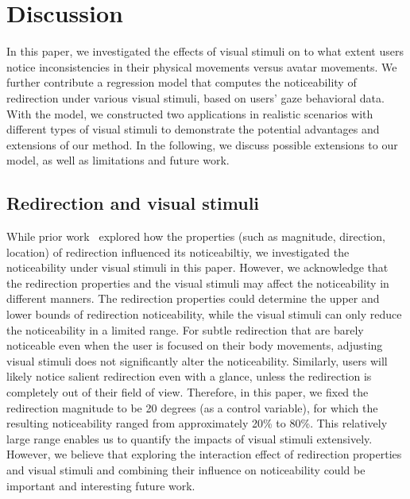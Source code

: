 \section{Discussion}
In this paper, we investigated the effects of visual stimuli on to what extent users notice inconsistencies in their physical movements versus avatar movements. 
We further contribute a regression model that computes the noticeability of redirection under various visual stimuli, based on users' gaze behavioral data.
With the model, we constructed two applications in realistic scenarios with different types of visual stimuli to demonstrate the potential advantages and extensions of our method.
In the following, we discuss possible extensions to our model, as well as limitations and future work.

\subsection{Redirection and visual stimuli}
While prior work~\cite{li2022modeling, feick2023investigating, feick2021visuo} explored how the properties (such as magnitude, direction, location) of redirection influenced its noticeabiltiy, we investigated the noticeability under visual stimuli in this paper.
However, we acknowledge that the redirection properties and the visual stimuli may affect the noticeability in different manners. 
The redirection properties could determine the upper and lower bounds of redirection noticeability, while the visual stimuli can only reduce the noticeability in a limited range.
For subtle redirection that are barely noticeable even when the user is focused on their body movements, adjusting visual stimuli does not significantly alter the noticeability.
Similarly, users will likely notice salient redirection even with a glance, unless the redirection is completely out of their field of view.
Therefore, in this paper, we fixed the redirection magnitude to be 20 degrees (as a control variable), for which the resulting noticeability ranged from approximately 20\% to 80\%.
This relatively large range enables us to quantify the impacts of visual stimuli extensively.
However, we believe that exploring the interaction effect of redirection properties and visual stimuli and combining their influence on noticeability could be important and interesting future work.

